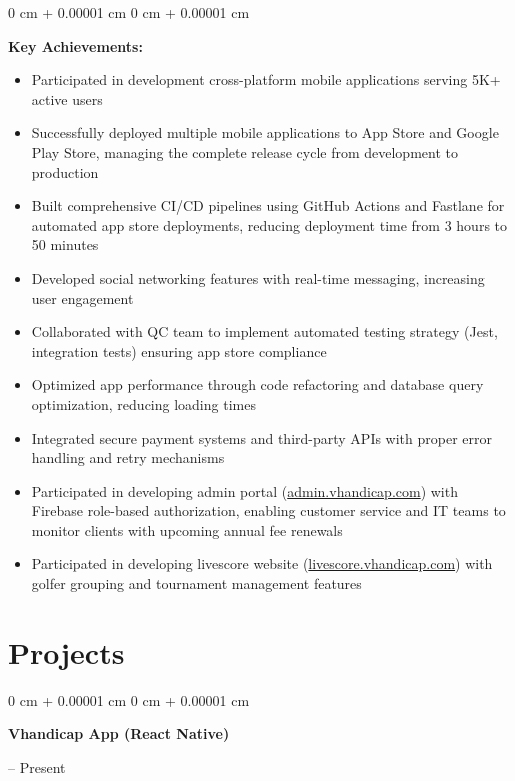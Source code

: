 \documentclass[10pt, letterpaper]{article}
\newenvironment{highlights}{
    \begin{itemize}[
        topsep=0.10 cm,
        parsep=0.10 cm,
        partopsep=0pt,
        itemsep=0pt,
        leftmargin=0 cm + 10pt
    ]
}{
    \end{itemize}
} %
\newenvironment{onecolentry}{
    \begin{adjustwidth}{
        0 cm + 0.00001 cm
    }{
        0 cm + 0.00001 cm
    }
}{
    \end{adjustwidth}
} %
\newenvironment{twocolentry}[2][]{
    \onecolentry
    \def\secondColumn{#2}
    \setcolumnwidth{\fill, 4.5 cm}
    \begin{paracol}{2}
}{
    \switchcolumn \raggedleft \secondColumn
    \end{paracol}
    \endonecolentry
} %
\begin{document}
        \vspace{0.15 cm}
        \begin{onecolentry}
            \textbf{Key Achievements:}
            \begin{highlights}
                \item Participated in development cross-platform mobile applications serving 5K+ active users
                \item Successfully deployed multiple mobile applications to App Store and Google Play Store, managing the complete release cycle from development to production
                \item Built comprehensive CI/CD pipelines using GitHub Actions and Fastlane for automated app store deployments, reducing deployment time from 3 hours to 50 minutes
                \item Developed social networking features with real-time messaging, increasing user engagement
                \item Collaborated with QC team to implement automated testing strategy (Jest, integration tests) ensuring app store compliance
                \item Optimized app performance through code refactoring and database query optimization, reducing loading times
                \item Integrated secure payment systems and third-party APIs with proper error handling and retry mechanisms
                \item Participated in developing admin portal (\href{https://admin.vhandicap.com}{admin.vhandicap.com}) with Firebase role-based authorization, enabling customer service and IT teams to monitor clients with upcoming annual fee renewals
                \item Participated in developing livescore website (\href{https://livescore.vhandicap.com}{livescore.vhandicap.com}) with golfer grouping and tournament management features
            \end{highlights}
        \end{onecolentry}

    \section{Projects}

        \begin{twocolentry}{
            2024 – Present
        }
            \textbf{Vhandicap App (React Native)}
        \end{twocolentry}
\end{document}
